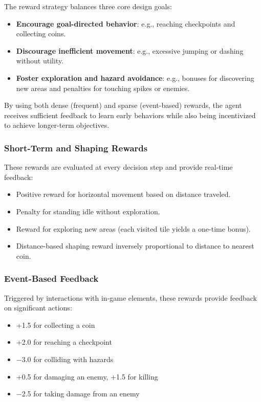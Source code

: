 \documentclass[12pt,oneside,openright,a4paper]{cpe-english-project}
\begin{document}
The reward strategy balances three core design goals:

\begin{itemize}
\item \textbf{Encourage goal-directed behavior}: e.g., reaching checkpoints and collecting coins.
\item \textbf{Discourage inefficient movement}: e.g., excessive jumping or dashing without utility.
\item \textbf{Foster exploration and hazard avoidance}: e.g., bonuses for discovering new areas and penalties for touching spikes or enemies.
\end{itemize}

By using both dense (frequent) and sparse (event-based) rewards, the agent receives sufficient feedback to learn early behaviors while also being incentivized to achieve longer-term objectives.

\subsubsection{Short-Term and Shaping Rewards}

These rewards are evaluated at every decision step and provide real-time feedback:

\begin{itemize}
\item Positive reward for horizontal movement based on distance traveled.
\item Penalty for standing idle without exploration.
\item Reward for exploring new areas (each visited tile yields a one-time bonus).
\item Distance-based shaping reward inversely proportional to distance to nearest coin.
\end{itemize}

\subsubsection{Event-Based Feedback}

Triggered by interactions with in-game elements, these rewards provide feedback on significant actions:

\begin{itemize}
\item +1.5 for collecting a coin
\item +2.0 for reaching a checkpoint
\item −3.0 for colliding with hazards
\item +0.5 for damaging an enemy, +1.5 for killing
\item −2.5 for taking damage from an enemy
\end{itemize}
\end{document}
